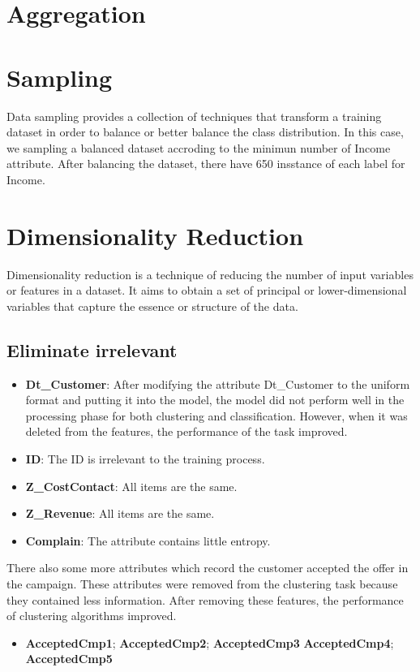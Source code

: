 \section{Aggregation} 

\section{Sampling}
Data sampling provides a collection of techniques that transform a training dataset in order to balance or better balance the class distribution.
In this case, we sampling a balanced dataset accroding to the minimun number of Income attribute. After balancing the dataset, there have 650 insstance of each label for Income.
\section{Dimensionality Reduction}
Dimensionality reduction is a technique of reducing the number of input variables or features in a dataset. It aims to obtain a set of principal or lower-dimensional variables that capture the essence or structure of the data.
\subsection{Eliminate irrelevant}

\begin{itemize}
    \item \textbf{Dt\_Customer}: After modifying the attribute Dt\_Customer to the uniform format and putting it into the model, the model did not perform well in the processing phase for both clustering and classification. However, when it was deleted from the features, the performance of the task improved.
    \item \textbf{ID}: The ID is irrelevant to the training process.
    \item \textbf{Z\_CostContact}: All items are the same.
    \item \textbf{Z\_Revenue}: All items are the same.
    \item \textbf{Complain}: The attribute contains little entropy.
\end{itemize}

There also some more attributes which record the customer accepted the offer in the campaign. These attributes were removed from the clustering task because they contained less information. After removing these features, the performance of clustering algorithms improved.
\begin{itemize}
    \item \textbf{AcceptedCmp1}; \textbf{AcceptedCmp2}; \textbf{AcceptedCmp3} \textbf{AcceptedCmp4}; \textbf{AcceptedCmp5}
\end{itemize}

